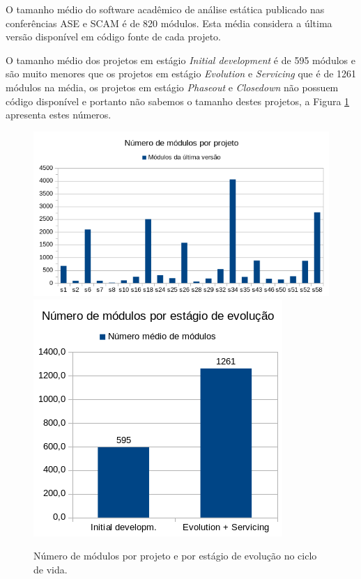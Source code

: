 O tamanho médio do software acadêmico de análise estática publicado nas
conferências ASE e SCAM é de 820 módulos. Esta média considera a última versão
disponível em código fonte de cada projeto.


O tamanho médio dos projetos em estágio {\it Initial development} é de 595
módulos e são muito menores que os projetos em estágio {\it Evolution} e {\it
Servicing} que é de 1261 módulos na média, os projetos em estágio {\it
Phaseout} e {\it Closedown} não possuem código disponível e portanto não
sabemos o tamanho destes projetos, a Figura \ref{modules-average} apresenta
estes números.

\begin{figure}[h]
  \center
  \includegraphics[scale=0.6]{imagens/modules-total.png}
  \includegraphics[scale=0.6]{imagens/modules-average.png}
  \caption{Número de módulos por projeto e por estágio de evolução no ciclo de vida.}
  \label{modules-average}
\end{figure}

